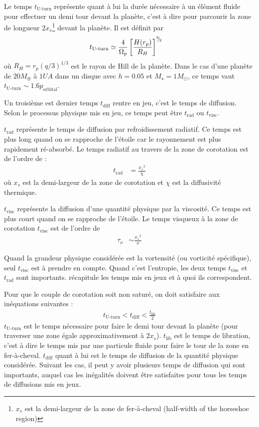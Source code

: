 Le temps $t_\text{U-turn}$ représente quant à lui la durée nécessaire à un élément fluide pour effectuer un demi tour devant la planète, c'est à dire pour parcourir la zone de longueur $2x_s$\footnote{$x_s$ est la demi-largeur de la zone de fer-à-cheval (\og half-width of the horseshoe region\fg)} devant la planète. Il est définit par \citep[eq. (64)]{baruteau2008corotation}
\begin{align}
t_\text{U-turn} &\simeq \frac{4}{\Omega_p}\left[\frac{H(r_p)}{R_H}\right]^{{}^{3\!\!}/ _{\!2}}
\end{align}
où $R_H=r_p (q/3)^{1/3}$ est le rayon de Hill de la planète. Dans le cas d'une planète de $20\unit{M_\oplus}$ à $1\unit{UA}$ dans un disque avec $h=0.05$ et $M_\star=1M_\odot$, ce temps vaut $t_\text{U-turn} \sim 1.6 p_\text{orbital}$.

Un troisième est dernier temps $t_\text{diff}$ rentre en jeu, c'est le temps de diffusion. Selon le processus physique mis en jeu, ce temps peut être $t_\text{rad}$ ou $t_\text{visc}$.

$t_\text{rad}$ représente le temps de diffusion par refroidissement radiatif. Ce temps est plus long quand on se rapproche de l'étoile car le rayonnement est plus rapidement ré-absorbé. Le temps radiatif au travers de la zone de corotation est de l'ordre de :
\begin{align}
t_\text{rad} &= \frac{{x_s}^2}{\chi}
\end{align}
où $x_s$ est la demi-largeur de la zone de corotation et $\chi$ est la diffusivité thermique.
 
$t_\text{visc}$ représente la diffusion d'une quantité physique par la viscosité. Ce temps est plus court quand on se rapproche de l'étoile. Le temps visqueux à la zone de corotation $t_\text{visc}$ est  de l'ordre de \citep{masset2001coorbital, masset2002coorbital, ogilvie2003saturation}
\begin{align}
\tau_\nu &\sim \frac{{x_s}^2}{\nu}
\end{align}

Quand la grandeur physique considérée est la vortensité (ou vorticité spécifique), seul $t_\text{visc}$ est à prendre en compte. Quand c'est l'entropie, les deux temps $t_\text{visc}$ et $t_\text{rad}$ sont importants.  récapitule les temps mis en jeux et à quoi ils correspondent.

\bigskip

Pour que le couple de corotation soit non saturé, on doit satisfaire aux inéquations suivantes \citep[eq. (31)]{baruteau2013recent} :
\begin{align}
t_\text{U-turn} < t_\text{diff} < \frac{t_\text{lib}}{2}
\end{align}
$t_\text{U-turn}$ est le temps nécessaire pour faire le demi tour devant la planète (pour traverser une zone égale approximativement à $2x_s$). $t_\text{lib}$ est le temps de libration, c'est à dire le temps mis par une particule fluide pour faire le tour de la zone en fer-à-cheval. $t_\text{diff}$ quant à lui est le temps de diffusion de la quantité physique considérée. Suivant les cas, il peut y avoir plusieurs temps de diffusion qui sont importants, auquel cas les inégalités doivent être satisfaites pour tous les temps de diffusions mis en jeux.

